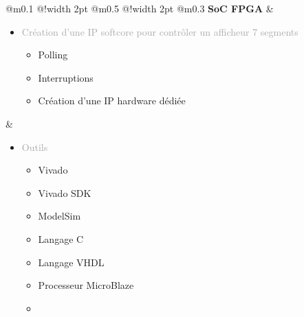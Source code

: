 \documentclass{article}
\begin{document}
\thispagestyle{student_lab_work_ENSEA}

\vspace*{0cm}

\vfill %



\begin{tabular}
{
    @{}m{}
    @{\hspace{0.001\textwidth}}!{\color{secondaryBlue}\vline width 2pt} %
    @{}m{0.5\textwidth}
    @{\hspace{0.025\textwidth}}!{\color{secondaryBlue}\vline width 2pt} %
    @{{\hspace{0.001\textwidth}}}m{0.3\textwidth}
}
\textcolor{secondaryBlue}
{
    \textbf{SoC FPGA}
} 
&
\begin{itemize}[label={}, topsep=8pt,partopsep=0pt, itemsep=0.5pt,parsep=2pt,after=\vspace*{-\baselineskip}] 
    \setlength{\itemsep}{1pt}
    \item \textcolor{darkGray}{Création d'une IP softcore pour contrôler un afficheur 7 segments}
    \begin{itemize}
    [label={\textcolor{gray!100}{\checkmark}},topsep=8pt,partopsep=0pt,itemsep=0.5pt,parsep=2pt,
     after=\vspace*{-\baselineskip}] 
        \item \textcolor{gray!100}{Polling}
        \item \textcolor{gray!100}{Interruptions}
        \item \textcolor{gray!100}{Création d'une IP hardware dédiée}
    \end{itemize}
\end{itemize}
&
\begin{itemize}
    [label={}, topsep=8pt, partopsep=0pt, itemsep=0.5pt, parsep=2pt,after=\vspace*{-\baselineskip}]
    \setlength{\itemsep}{10pt}
    \item \textcolor{darkGray}{Outils}
    \begin{itemize}[label={\textcolor{gray!100}{\checkmark}}, topsep=8pt, 
        partopsep=0pt, itemsep=0.5pt, parsep=2pt, after=\vspace*{-\baselineskip}] 
        
        \item \textcolor{gray!100}{Vivado}
        \item \textcolor{gray!100}{Vivado SDK}
        \item \textcolor{gray!100}{ModelSim}
        \item \textcolor{gray!100}{Langage C}
        \item \textcolor{gray!100}{Langage VHDL}
        \item \textcolor{gray!100}{Processeur MicroBlaze}
        \item[\textcolor{white}{\checkmark}] \textcolor{gray!100}{} %

    \end{itemize}
\end{itemize}
\end{tabular}
\end{document}
